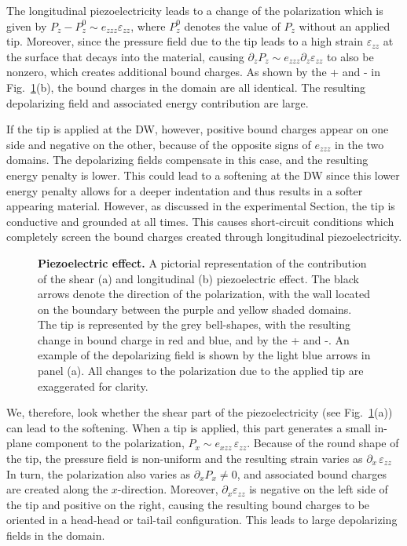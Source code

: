 The longitudinal piezoelectricity leads to a change of the polarization which is given by $P_z - P^0_z \sim e_{zzz} \varepsilon_{zz}$, where $P^0_z$ denotes the value of $P_z$ without an applied tip.
Moreover, since the pressure field due to the tip leads to a high strain $\varepsilon_{zz}$ at the surface that decays into the material, causing $\partial_{z} P_z \sim e_{zzz} \partial_z \varepsilon_{zz}$ to also be nonzero, which creates additional bound charges.
As shown by the + and - in Fig.~\ref{fig:BTO_depolarizing}(b), the bound charges in the domain are all identical.
The resulting depolarizing field and associated energy contribution are large.

If the tip is applied at the \gls{DW}, however, positive bound charges appear on one side and negative on the other, because of the opposite signs of $e_{zzz}$ in the two domains.
The depolarizing fields compensate in this case, and the resulting energy penalty is lower.
This could lead to a softening at the \gls{DW} since this lower energy penalty allows for a deeper indentation and thus results in a softer appearing material.
However, as discussed in the experimental Section, the tip is conductive and grounded at all times.
This causes short-circuit conditions which completely screen the bound charges created through longitudinal piezoelectricity.
\begin{figure}[h]
	\caption{\label{fig:BTO_depolarizing}{\bf Piezoelectric effect.} A pictorial representation of the contribution of the shear (a) and longitudinal (b) piezoelectric effect. The black arrows denote the direction of the polarization, with the wall located on the boundary between the purple and yellow shaded domains. The tip is represented by the grey bell-shapes, with the resulting change in bound charge in red and blue, and by the + and -. An example of the depolarizing field is shown by the light blue arrows in panel (a). All changes to the polarization due to the applied tip are exaggerated for clarity.}
\end{figure}

We, therefore, look whether the shear part of the piezoelectricity (see Fig.~\ref{fig:BTO_depolarizing}(a)) can lead to the softening.
When a tip is applied, this part generates a small in-plane component to the polarization, $P_x \sim e_{xzz}\,\varepsilon_{zz}$.
Because of the round shape of the tip, the pressure field is non-uniform and the resulting strain varies as $\partial_x\,\varepsilon_{zz}$
In turn, the polarization also varies as $\partial_x P_x\neq 0$, and associated bound charges are created along the $x$-direction.
Moreover, $\partial_x \varepsilon_{zz}$ is negative on the left side of the tip and positive on the right, causing the resulting bound charges to be oriented in a head-head or tail-tail configuration.
This leads to large depolarizing fields in the domain.

